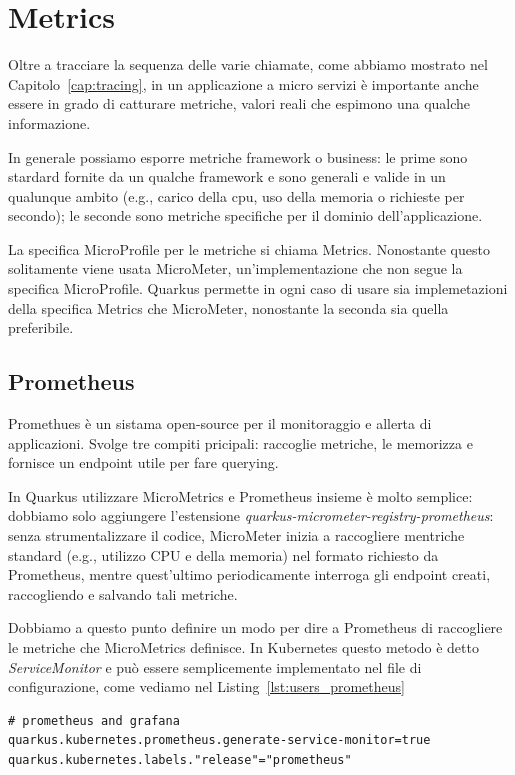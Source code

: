 \chapter{Metrics}
Oltre a tracciare la sequenza delle varie chiamate, come abbiamo mostrato nel Capitolo~\ref{cap:tracing}, in un applicazione a micro servizi è importante anche essere in grado di catturare metriche, valori reali che espimono una qualche informazione.

In generale possiamo esporre metriche framework o business: le prime sono stardard fornite da un qualche framework e sono generali e valide in un qualunque ambito (e.g., carico della cpu, uso della memoria o richieste per secondo); le seconde sono metriche specifiche per il dominio dell'applicazione.

\myskip

La specifica MicroProfile per le metriche si chiama Metrics. Nonostante questo solitamente viene usata MicroMeter, un'implementazione che non segue la specifica MicroProfile. Quarkus permette in ogni caso di usare sia implemetazioni della specifica Metrics che MicroMeter, nonostante la seconda sia quella preferibile.

\section{Prometheus}
\label{sec:prometheus}
Promethues è un sistama open-source per il monitoraggio e allerta di applicazioni. Svolge tre compiti pricipali: raccoglie metriche, le memorizza e fornisce un endpoint utile per fare querying.

\myskip

In Quarkus utilizzare MicroMetrics e Prometheus insieme è molto semplice: dobbiamo solo aggiungere l'estensione \textit{quarkus-micrometer-registry-prometheus}: senza strumentalizzare il codice, MicroMeter inizia a raccogliere mentriche standard (e.g., utilizzo CPU e della memoria) nel formato richiesto da Prometheus, mentre quest'ultimo periodicamente interroga gli endpoint creati, raccogliendo e salvando tali metriche.

Dobbiamo a questo punto definire un modo per dire a Prometheus di raccogliere le metriche che MicroMetrics definisce. In Kubernetes questo metodo è detto \textit{ServiceMonitor} e può essere semplicemente implementato nel file di configurazione, come vediamo nel Listing~\ref{lst:users_prometheus}
\begin{lstlisting}[caption=Prometheus configuration for \textit{users-service}, label=lst:users_prometheus]
# prometheus and grafana
quarkus.kubernetes.prometheus.generate-service-monitor=true
quarkus.kubernetes.labels."release"="prometheus"
\end{lstlisting}

